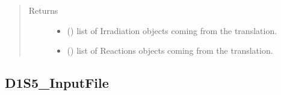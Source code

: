 \documentclass[letterpaper,10pt,english]{sphinxmanual}
\begin{document}
\begin{fulllineitems}
\begin{fulllineitems}
\begin{quote}
\begin{description}
\item[{Returns}] \leavevmode
\sphinxAtStartPar
\begin{itemize}
\item {} 
\sphinxAtStartPar
{} () \textendash{} list of Irradiation objects coming from the translation.

\item {} 
\sphinxAtStartPar
{} () \textendash{} list of Reactions objects coming from the translation.

\end{itemize}


\end{description}\end{quote}

\end{fulllineitems}


\end{fulllineitems}



\subsection{D1S5\_InputFile}
\label{\detokenize{api/inputgeneration:d1s5-inputfile}}
\end{document}
